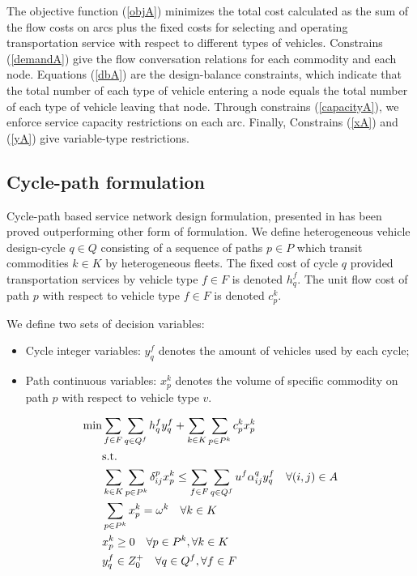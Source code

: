 \documentclass[11pt,nonblindrev,fleqn]{article}
\begin{document}
The objective function (\ref{objA}) minimizes the total cost calculated as the sum of the flow costs on arcs plus the fixed costs for selecting and operating transportation service with respect to different types of vehicles. Constrains (\ref{demandA}) give the flow conversation relations for each commodity and each node. Equations (\ref{dbA}) are the design-balance constraints, which indicate that the total number of each type of vehicle entering a node equals the total number of each type of vehicle leaving that node. Through constrains (\ref{capacityA}), we enforce service capacity restrictions on each arc. Finally, Constrains (\ref{xA}) and (\ref{yA}) give variable-type restrictions.

\subsection{Cycle-path formulation}
Cycle-path based service network design formulation, presented in \cite{Andersen2011Branch} has been proved outperforming other form of formulation. We define heterogeneous vehicle design-cycle $q\in Q$ consisting of a sequence of paths $p\in P$ which transit commodities $k\in K$ by heterogeneous fleets. The fixed cost of cycle $q$ provided transportation services by vehicle type $f\in F$ is denoted $h_q^f$. The unit flow cost of path $p$ with respect to vehicle type $f\in F$ is denoted $c_p^k$.

We define two sets of decision variables:
\begin{itemize}
  \item Cycle integer variables: $y_q^f$ denotes the amount of vehicles used by each cycle;
  \item Path continuous variables: $x_p^k$ denotes the volume of specific commodity on path $p$ with respect to vehicle type $v$.
\end{itemize}

\begin{align}
  \min &    \sum_{f\in F}\sum_{q\in Q^f}h_q^f y_q^f  +   \sum_{k\in K}\sum_{p\in P^k}c_p^k x_p^k  \label{objCP}    \\
         & \rm{s.t.} \nonumber \\
         &     \sum_{k\in K}\sum_{p\in P^k}\delta_{ij}^p x_p^k \leq  \sum_{f\in F}\sum_{q\in Q^f}u^f \alpha_{ij}^q y_q^f      \quad \forall (i,j)\in A \label{capacityCP}\\
         &     \sum_{p\in P^k}x_p^k = \omega^k      \quad       \forall k\in K  \label{demandCP}    \\
         &      x_p^k \geq 0        \quad       \forall p\in P^k,\forall k\in K     \label{xCP} \\
         &      y_q^f \in Z_0^+     \quad       \forall q\in Q^f, \forall f\in F    \label{yCP}
\end{align}
\end{document}
